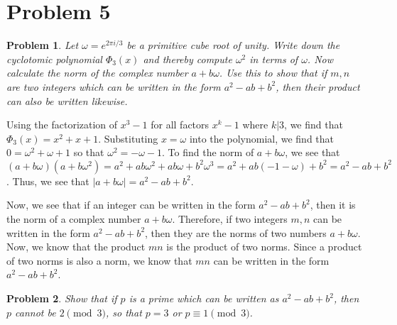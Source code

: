 \documentclass[psamsfonts]{amsart}
\newtheorem{prob}{Problem}[section]
\newenvironment{sol}{{\bfseries Solution}}{\qedsymbol}
\theoremstyle{definition}
\theoremstyle{remark}
\numberwithin{equation}{section}
\begin{document}
\section{Problem 5}

\begin{prob}
Let $\omega = e^{2 \pi i/3}$ be a primitive cube root of unity. Write down the cyclotomic polynomial $\Phi_3 (x)$ and thereby compute $\omega^2$ in terms of $\omega$. Now calculate the norm of the complex number $a + b \omega$. Use this to show that if $m,n$ are two integers which can be written in the form $a^2 - ab + b^2$, then their product can also be written likewise. 
\end{prob}

\begin{sol}
Using the factorization of $x^3 - 1$ for all factors $x^k - 1$ where $k | 3$, we find that $\Phi_3(x) = x^2 + x + 1$. Substituting $x = \omega$ into the polynomial, we find that $0 = \omega^2 + \omega + 1$ so that $\omega^2 = - \omega - 1$. To find the norm of $a + b \omega$, we see that $(a + b \omega) (a + b \omega^2) =  a^2 + ab \omega^2 + ab \omega + b^2 \omega^3 =  a^2 + ab ( - 1 - \omega) + b^2  = a^2 - ab + b^2$. Thus, we see that $|a + b \omega| = a^2 - ab + b^2$. 

Now, we see that if an integer can be written in the form $a^2 - ab + b^2$, then it is the norm of a complex number $a + b \omega$. Therefore, if two integers $m,n$ can be written in the form $a^2 - ab + b^2$, then they are the norms of two numbers $a + b \omega$. Now, we know that the product $mn$ is the product of two norms. Since a product of two norms is also a norm, we know that $mn$ can be written in the form $a^2 - ab + b^2$. 
\end{sol}

\begin{prob}
Show that if $p$ is a prime which can be written as $a^2 - ab + b^2$, then $p$ cannot be $2 \pmod{3}$, so that $p= 3$ or $p \equiv 1 \pmod{3}$. 
\end{prob}
\end{document}
